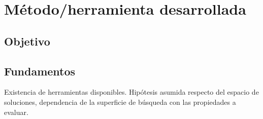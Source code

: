 
\chapter{Método/herramienta desarrollada}

\section{Objetivo}

\section{Fundamentos}
Existencia de herramientas disponibles.
Hipótesis asumida respecto del espacio de soluciones, dependencia de la superficie de búsqueda con las propiedades a evaluar.


